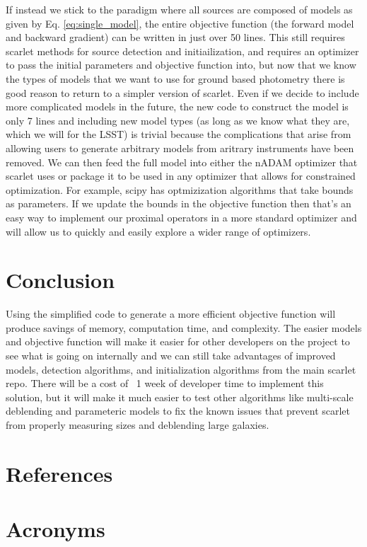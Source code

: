 \documentclass[DM,authoryear,toc]{lsstdoc}
\begin{document}
If instead we stick to the paradigm where all sources are composed of models as given by Eq. \ref{eq:single_model}, the entire objective function (the forward model and backward gradient) can be written in just over 50 lines. This still requires scarlet methods for source detection and initiailization, and requires an optimizer to pass the initial parameters and objective function into, but now that we know the types of models that we want to use for ground based photometry there is good reason to return to a simpler version of scarlet. Even if we decide to include more complicated models in the future, the new code to construct the model is only 7 lines and including new model types (as long as we know what they are, which we will for the LSST) is trivial because the complications that arise from allowing users to generate arbitrary models from aritrary instruments have been removed. We can then feed the full model into either the nADAM optimizer that scarlet uses or package it to be used in any optimizer that allows for constrained optimization. For example, scipy has optmizization algorithms that take bounds as parameters. If we update the bounds in the objective function then that's an easy way to implement our proximal operators in a more standard optimizer and will allow us to quickly and easily explore a wider range of optimizers.

\section{Conclusion}

Using the simplified code to generate a more efficient objective function will produce savings of memory, computation time, and complexity. The easier models and objective function will make it easier for other developers on the project to see what is going on internally and we can still take advantages of improved models, detection algorithms, and initialization algorithms from the main scarlet repo. There will be a cost of ~1 week of developer time to implement this solution, but it will make it much easier to test other algorithms like multi-scale deblending and parameteric models to fix the known issues that prevent scarlet from properly measuring sizes and deblending large galaxies.

\appendix
\section{References} \label{sec:bib}
\renewcommand{\refname}{} %


\section{Acronyms} \label{sec:acronyms}

\end{document}
